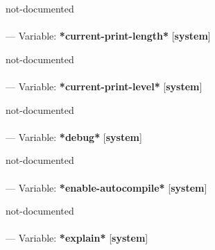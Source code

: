 \begin{adjustwidth}{5em}{5em}
not-documented
\end{adjustwidth}

\paragraph{}
\label{SYSTEM:*CURRENT-PRINT-LENGTH*}
--- Variable: \textbf{*current-print-length*} [\textbf{system}] \textit{}

\begin{adjustwidth}{5em}{5em}
not-documented
\end{adjustwidth}

\paragraph{}
\label{SYSTEM:*CURRENT-PRINT-LEVEL*}
--- Variable: \textbf{*current-print-level*} [\textbf{system}] \textit{}

\begin{adjustwidth}{5em}{5em}
not-documented
\end{adjustwidth}

\paragraph{}
\label{SYSTEM:*DEBUG*}
--- Variable: \textbf{*debug*} [\textbf{system}] \textit{}

\begin{adjustwidth}{5em}{5em}
not-documented
\end{adjustwidth}

\paragraph{}
\label{SYSTEM:*ENABLE-AUTOCOMPILE*}
--- Variable: \textbf{*enable-autocompile*} [\textbf{system}] \textit{}

\begin{adjustwidth}{5em}{5em}
not-documented
\end{adjustwidth}

\paragraph{}
\label{SYSTEM:*EXPLAIN*}
--- Variable: \textbf{*explain*} [\textbf{system}] \textit{}

